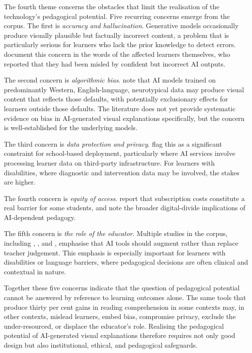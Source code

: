 The fourth theme concerns the obstacles that limit the realisation of the technology's pedagogical potential. Five recurring concerns emerge from the corpus. The first is \emph{accuracy and hallucination}. Generative models occasionally produce visually plausible but factually incorrect content, a problem that is particularly serious for learners who lack the prior knowledge to detect errors. \citet{buhler2024} document this concern in the words of the affected learners themselves, who reported that they had been misled by confident but incorrect AI outputs.

The second concern is \emph{algorithmic bias}. \citet{ahmad2025} note that AI models trained on predominantly Western, English-language, neurotypical data may produce visual content that reflects those defaults, with potentially exclusionary effects for learners outside those defaults. The literature does not yet provide systematic evidence on bias in AI-generated visual explanations specifically, but the concern is well-established for the underlying models.

The third concern is \emph{data protection and privacy}. \citet{bewersdorff2024} flag this as a significant constraint for school-based deployment, particularly where AI services involve processing learner data on third-party infrastructure. For learners with disabilities, where diagnostic and intervention data may be involved, the stakes are higher.

The fourth concern is \emph{equity of access}. \citet{buhler2024} report that subscription costs constitute a real barrier for some students, and \citet{ahmad2025} note the broader digital-divide implications of AI-dependent pedagogy.

The fifth concern is \emph{the role of the educator}. Multiple studies in the corpus, including \citet{bewersdorff2024}, \citet{ahmad2025}, and \citet{drosos2025}, emphasise that AI tools should augment rather than replace teacher judgement. This emphasis is especially important for learners with disabilities or language barriers, where pedagogical decisions are often clinical and contextual in nature.

Together these five concerns indicate that the question of pedagogical potential cannot be answered by reference to learning outcomes alone. The same tools that produce thirty per cent gains in reading comprehension in some contexts may, in other contexts, mislead learners, embed bias, compromise privacy, exclude the under-resourced, or displace the educator's role. Realising the pedagogical potential of AI-generated visual explanations therefore requires not only good design but also institutional, ethical, and pedagogical safeguards.

